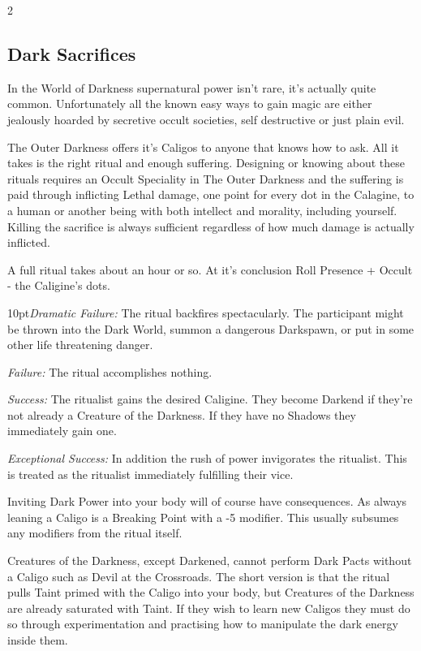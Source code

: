 \begin{multicols}{2}
\subsection*{Dark Sacrifices}

In the World of Darkness supernatural power isn't rare, it's actually quite common. Unfortunately all the known easy ways to gain magic are either jealously hoarded by secretive occult societies, self destructive or just plain evil.

The Outer Darkness offers it's Caligos to anyone that knows how to ask. All it takes is the right ritual and enough suffering. Designing or knowing about these rituals requires an Occult Speciality in The Outer Darkness and the suffering is paid through inflicting Lethal damage, one point for every dot in the Calagine, to a human or another being with both intellect and morality, including yourself. Killing the sacrifice is always sufficient regardless of how much damage is actually inflicted.

A full ritual takes about an hour or so. At it's conclusion Roll Presence + Occult - the Caligine's dots.

\begin{myindentpar}{10pt}\emph{Dramatic Failure:} The ritual backfires spectacularly. The participant might be thrown into the Dark World, summon a dangerous Darkspawn, or put in some other life threatening danger.
    
    \emph{Failure:} The ritual accomplishes nothing.
    
    \emph{Success:} The ritualist gains the desired Caligine. They become Darkend if they're not already a Creature of the Darkness. If they have no Shadows they immediately gain one.
    
    \emph{Exceptional Success:} In addition the rush of power invigorates the ritualist. This is treated as the ritualist immediately fulfilling their vice.\end{myindentpar}

Inviting Dark Power into your body will of course have consequences. As always leaning a Caligo is a Breaking Point with a -5 modifier. This usually subsumes any modifiers from the ritual itself.

Creatures of the Darkness, except Darkened, cannot perform Dark Pacts without a Caligo such as Devil at the Crossroads. The short version is that the ritual pulls Taint primed with the Caligo into your body, but Creatures of the Darkness are already saturated with Taint. If they wish to learn new Caligos they must do so through experimentation and practising how to manipulate the dark energy inside them. 



\end{multicols}
